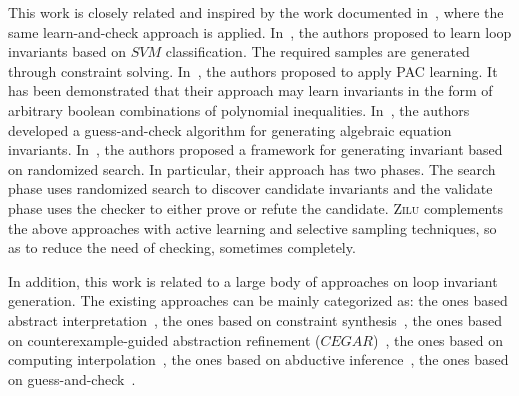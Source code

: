 This work is closely related and inspired by the work documented in~\cite{sharma2012interpolants,sharma2013verification,DBLP:conf/esop/0001GHALN13,sharma2014invariant}, 
where the same learn-and-check approach is applied. 
In~\cite{sharma2012interpolants}, the authors proposed to learn loop invariants based on $\mathit{SVM}$ classification. 
The required samples are generated through constraint solving. In~\cite{sharma2013verification}, the authors proposed to apply PAC learning. 
It has been demonstrated that their approach may learn invariants in the form of arbitrary boolean
combinations of polynomial inequalities. In~\cite{DBLP:conf/esop/0001GHALN13}, 
the authors developed a guess-and-check algorithm for generating algebraic equation invariants. 
In~\cite{sharma2014invariant}, the authors proposed a framework for generating invariant based on randomized search. 
In particular, their approach has two phases. 
The search phase uses randomized search to discover candidate invariants and the validate phase uses the checker to either prove or refute the candidate. 
\textsc{Zilu} complements the above approaches with active learning and selective sampling techniques, so as to reduce the need of checking, sometimes completely.

In addition, this work is related to a large body of approaches on loop invariant generation. The existing approaches can be mainly categorized as:
the ones based abstract interpretation~\cite{cousot1978automatic,mine2006octagon,cousot1979systematic,karr1976affine,vincent2009subpolyhedra}, 
the ones based on constraint synthesis~\cite{ashutosh2009invgen,michael2003linear,sumit2009constraint}, 
the ones based on counterexample-guided abstraction refinement ($\mathit{CEGAR}$)~\cite{henzinger2003software,thomas2001slam,edmund2003counterexample}, 
the ones based on computing interpolation~\cite{kenneth2010lazy,thomas2004abstractions,kenneth2003interpolation,Kenneth2006lazy}, 
the ones based on abductive inference~\cite{isil2013inductive}, 
the ones based on guess-and-check~\cite{cormac2001houdini,ernst2007daikon}.

